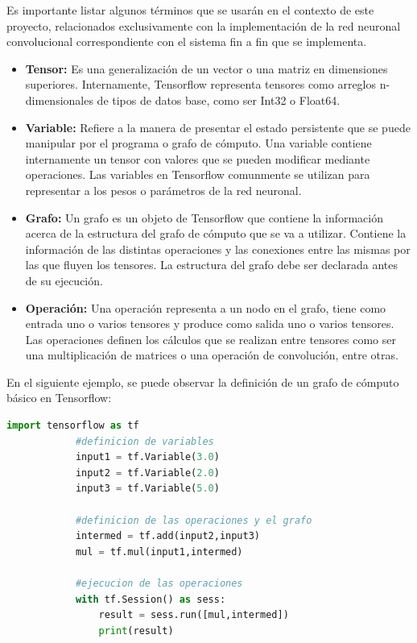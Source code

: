     Es importante listar algunos términos que se usarán en el contexto de este proyecto, relacionados exclusivamente con la implementación 
    de la red neuronal convolucional correspondiente con el sistema fin a fin que se implementa. 
    \begin{itemize}
        \item \textbf{Tensor:} Es una generalización de un vector o una matriz en dimensiones superiores. Internamente, 
        Tensorflow representa tensores como arreglos n-dimensionales de tipos de datos base, como ser Int32 o Float64.

        \item \textbf{Variable: } Refiere a la manera de presentar el estado persistente que se puede manipular por el 
        programa o grafo de cómputo. Una variable contiene internamente un tensor con valores que se pueden modificar 
        mediante operaciones. Las variables en Tensorflow comunmente se utilizan para representar a los pesos o parámetros 
        de la red neuronal.

        \item \textbf{Grafo:} Un grafo es un objeto de Tensorflow que contiene la información acerca de la estructura 
        del grafo de cómputo que se va a utilizar. Contiene la información de las distintas operaciones y las conexiones 
        entre las mismas por las que fluyen los tensores. La estructura del grafo debe ser declarada antes de su ejecución.

        \item \textbf{Operación:} Una operación representa a un nodo en el grafo, tiene como entrada uno o varios 
        tensores y produce como salida uno o varios tensores. Las operaciones definen los cálculos que se realizan entre 
        tensores como ser una multiplicación de matrices o una operación de convolución, entre otras.
    \end{itemize}

    En el siguiente ejemplo, se puede observar la definición de un grafo de cómputo básico en Tensorflow:

    \begin{lstlisting}[title={Ejemplo de un programa escrito con Tensorflow},captionpos=b,language=Python]
        import tensorflow as tf 
            #definicion de variables
            input1 = tf.Variable(3.0) 
            input2 = tf.Variable(2.0)
            input3 = tf.Variable(5.0)

            #definicion de las operaciones y el grafo
            intermed = tf.add(input2,input3)
            mul = tf.mul(input1,intermed)

            #ejecucion de las operaciones 
            with tf.Session() as sess:
                result = sess.run([mul,intermed])
                print(result) 

    \end{lstlisting}

